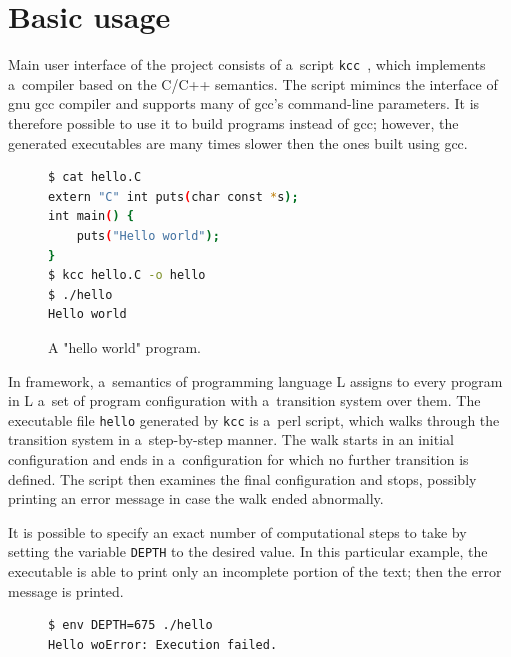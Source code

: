 \documentclass{fithesis3}
\newcommand{\kcc}{\texttt{kcc}\xspace}
\begin{document}

\section{Basic usage}

Main user interface of the project consists of a~script \kcc~\cite{hathhorn-ellison-rosu-2015-pldi}, which implements a~compiler based on the C/C++ semantics. The script mimincs the interface of gnu gcc compiler and supports many of gcc's command-line parameters. It is therefore possible to use it to build programs instead of gcc; however, the generated executables are many times slower then the ones built using gcc.

\begin{figure}[h]
\begin{lstlisting}[language=bash]
$ cat hello.C
extern "C" int puts(char const *s);
int main() {
	puts("Hello world");
}
$ kcc hello.C -o hello
$ ./hello
Hello world
\end{lstlisting}
\caption{A "hello world" program.}
\label{helloWorldSource}
\end{figure}

In \K framework, a~semantics of programming language L assigns to every program in L a~set of program configuration with a~transition system over them. The executable file \texttt{hello} generated by \kcc is a~perl script, which walks through the transition system in a~step-by-step manner. The walk starts in an initial configuration and ends in a~configuration for which no further transition is defined. The script then examines the final configuration and stops, possibly printing an error message in case the walk ended abnormally.

It is possible to specify an exact number of computational steps to take by setting the variable \texttt{DEPTH} to the desired value. In this particular example, the executable is able to print only an incomplete portion of the text; then the error message is printed. 

\begin{figure}[h]
\begin{lstlisting}[language=bash]
$ env DEPTH=675 ./hello
Hello woError: Execution failed.
\end{lstlisting}
\end{figure}
\end{document}

